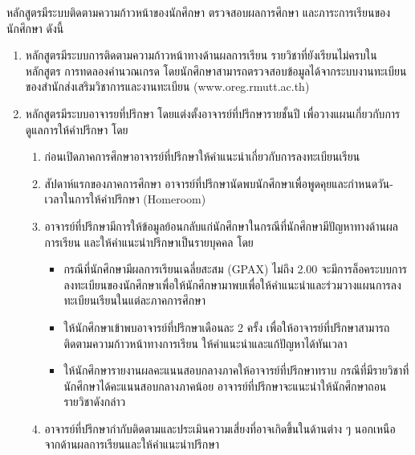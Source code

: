 \begin{doclist}
\end{doclist}



หลักสูตรมีระบบติดตามความก้าวหน้าของนักศึกษา ตรวจสอบผลการศึกษา และภาระการเรียนของนักศึกษา ดังนี้
 \begin{enumerate}
 	\item  หลักสูตรมีระบบการติดตามความก้าวหน้าทางด้านผลการเรียน รายวิชาที่ยังเรียนไม่ครบในหลักสูตร การทดลองคำนวณเกรด โดยนักศึกษาสามารถตรวจสอบข้อมูลได้จากระบบงานทะเบียนของสำนักส่งเสริมวิชาการและงานทะเบียน (www.oreg.rmutt.ac.th) 
 	\item หลักสูตรมีระบบอาจารยที่ปรึกษา โดยแต่งตั้งอาจารย์ที่ปรึกษารายชั้นปี เพื่อวางแผนเกี่ยวกับการดูแลการให้คำปรึกษา โดย
 \begin{enumerate}[label=(\arabic*),leftmargin=0.8cm, labelsep=2mm]
 	\item ก่อนเปิดภาคการศึกษาอาจารย์ที่ปรึกษาให้คำแนะนำเกี่ยวกับการลงทะเบียนเรียน
	\item สัปดาห์แรกของภาคการศึกษา อาจารย์ที่ปรึกษานัดพบนักศึกษาเพื่อพูดคุยและกำหนดวัน-เวลาในการให้คำปรึกษา (Homeroom) 
	\item อาจารย์ที่ปรึกษามีการให้ข้อมูลย้อนกลับแก่นักศึกษาในกรณีที่นักศึกษามีปัญหาทางด้านผลการเรียน และให้คำแนะนำปรึกษาเป็นรายบุคคล โดย
	\begin{itemize}
		\item กรณีที่นักศึกษามีผลการเรียนเฉลี่ยสะสม (GPAX) ไม่ถึง 2.00 จะมีการล็อคระบบการลงทะเบียนของนักศึกษาเพื่อให้นักศึกษามาพบเพื่อให้คำแนะนำและร่วมวางแผนการลงทะเบียนเรียนในแต่ละภาคการศึกษา  
		\item ให้นักศึกษาเข้าพบอาจารย์ที่ปรึกษาเดือนละ 2 ครั้ง เพื่อให้อาจารย์ที่ปรึกษาสามารถติดตามความก้าวหน้าทางการเรียน ให้คำแนะนำและแก้ปัญหาได้ทันเวลา
		\item ให้นักศึกษารายงานผลคะแนนสอบกลางภาคให้อาจารย์ที่ปรึกษาทราบ กรณีที่มีรายวิชาที่นักศึกษาได้คะแนนสอบกลางภาคน้อย อาจารย์ที่ปรึกษาจะแนะนำให้นักศึกษาถอนรายวิชาดังกล่าว 
	\end{itemize}
	\item อาจารย์ที่ปรึกษากำกับติดตามและประเมินความเสี่ยงที่อาจเกิดขึ้นในด้านต่าง ๆ นอกเหนือจากด้านผลการเรียนและให้คำแนะนำปรึกษา

\end{enumerate}
\end{enumerate}
